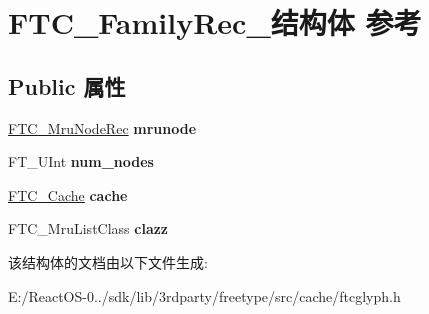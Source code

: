 \hypertarget{struct_f_t_c___family_rec__}{}\section{F\+T\+C\+\_\+\+Family\+Rec\+\_\+结构体 参考}
\label{struct_f_t_c___family_rec__}
\subsection*{Public 属性}
\begin{DoxyCompactItemize}
\item 
\mbox{\label{struct_f_t_c___family_rec___a8e2b6efbc862107de51d6ee87f2cd09a}} 
\hyperlink{struct_f_t_c___mru_node_rec__}{F\+T\+C\+\_\+\+Mru\+Node\+Rec} {\bfseries mrunode}
\item 
\mbox{\label{struct_f_t_c___family_rec___a5878abfe3f75aca4550738264ddd5543}} 
F\+T\+\_\+\+U\+Int {\bfseries num\+\_\+nodes}
\item 
\mbox{\label{struct_f_t_c___family_rec___a4c004b25e43bb56007b037e8e6f1cc98}} 
\hyperlink{struct_f_t_c___cache_rec__}{F\+T\+C\+\_\+\+Cache} {\bfseries cache}
\item 
\mbox{\label{struct_f_t_c___family_rec___a27df67b5c3396c6ccb61b8db231333bf}} 
F\+T\+C\+\_\+\+Mru\+List\+Class {\bfseries clazz}
\end{DoxyCompactItemize}


该结构体的文档由以下文件生成\+:\begin{DoxyCompactItemize}
\item 
E\+:/\+React\+O\+S-\/0../sdk/lib/3rdparty/freetype/src/cache/ftcglyph.\+h\end{DoxyCompactItemize}
